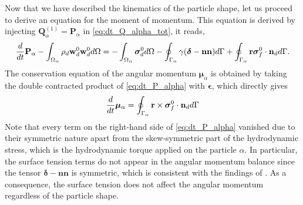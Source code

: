 Now that we have described the kinematics   of the particle shape, let us proceed to derive an equation for the moment of momentum.
This equation is derived by injecting $\textbf{Q}_\alpha^{(1)} = \textbf{P}_\alpha$ in \ref{eq:dt_Q_alpha_tot}, it reads, 
\begin{equation}
    \ddt {\textbf{P}_\alpha}
    - \intO{ \rho_d  \textbf{w}_d^0 \textbf{w}_d^0 }
    = 
    - \intO{\bm{\sigma}_d^0}
    - \intS{ 
        \gamma (\bm\delta - \textbf{nn})
    }
    + \intS{ \textbf{r}\bm{\sigma}_f^0\cdot \textbf{n}_d}.
    \label{eq:dt_P_alpha}
\end{equation}
The conservation equation of the angular momentum $\bm{\mu}_\alpha$ is obtained by taking the double contracted product of \ref{eq:dt_P_alpha} with $\bm\epsilon$, which directly gives
\begin{equation}
    \ddt\bm{\mu}_\alpha
    =  
    \intS{ \textbf{r} \times \bm{\sigma}_f^0\cdot \textbf{n}_d }
    \label{eq:dt_mu_alpha}
\end{equation}
Note that every term on the right-hand side of \ref{eq:dt_P_alpha} vanished due to their symmetric nature apart from the skew-symmetric part of the hydrodynamic stress, which is the hydrodynamic torque applied on the particle $\alpha$.
In particular, the surface tension terms do not appear in the angular momentum balance since the tensor $\bm\delta-\textbf{nn}$ is symmetric, which is consistent with the findings of \citet{hesla1993note}. 
As a consequence, the surface tension does not affect the angular momentum regardless of the particle shape. 

